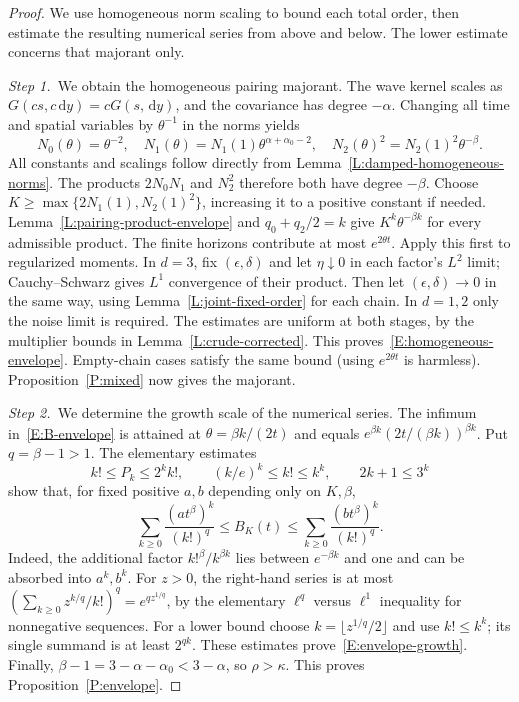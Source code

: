 \documentclass[12pt,oneside,openany]{book}
\numberwithin{equation}{section}
\theoremstyle{nogostyle}
\theoremstyle{definition}
\newcommand{\ud}{\,\mathrm{d}}
\begin{document}
\begin{proof}
  We use homogeneous norm scaling to bound each total order, then estimate the
  resulting numerical series from above and below. The lower estimate concerns
  that majorant only.


  \medskip
  \noindent\textit{Step 1.~}We obtain the homogeneous pairing majorant.
  The wave kernel scales as $G(cs,c\ud y) = cG(s,\ud y)$, and the covariance has
  degree $-\alpha$. Changing all time and spatial variables by $\theta^{-1}$ in
  the norms yields
  \begin{equation}\label{E:homogeneous-norms}
    N_0(\theta)=\theta^{-2},\quad
    N_1(\theta)=N_1(1)\theta^{\alpha+\alpha_0-2},\quad
    N_2(\theta)^2=N_2(1)^2\theta^{-\beta}.
  \end{equation}
  All constants and scalings follow directly from
  Lemma~\ref{L:damped-homogeneous-norms}. The products $2N_0N_1$ and $N_2^2$
  therefore both have degree $-\beta$. Choose $K \ge \max\{2N_1(1),N_2(1)^2\}$,
  increasing it to a positive constant if needed.
  Lemma~\ref{L:pairing-product-envelope} and $q_0+q_2/2 = k$ give
  $K^k\theta^{-\beta k}$ for every admissible product. The finite horizons
  contribute at most $e^{2\theta t}$. Apply this first to regularized moments.
  In $d = 3$, fix $(\epsilon,\delta)$ and let $\eta\downarrow0$ in each factor's
  $L^2$ limit; Cauchy--Schwarz gives $L^1$ convergence of their product. Then
  let $(\epsilon,\delta) \to 0$ in the same way, using
  Lemma~\ref{L:joint-fixed-order} for each chain. In $d = 1,2$ only the noise
  limit is required. The estimates are uniform at both stages, by the multiplier
  bounds in Lemma~\ref{L:crude-corrected}. This
  proves~\eqref{E:homogeneous-envelope}. Empty-chain cases satisfy the same
  bound (using $e^{2\theta t}$ is harmless). Proposition~\ref{P:mixed} now gives
  the majorant.


  \medskip
  \noindent\textit{Step 2.~}We determine the growth scale of the numerical
  series.
  The infimum in~\eqref{E:B-envelope} is attained at $\theta = \beta k/(2t)$ and
  equals $e^{\beta k}(2t/(\beta k))^{\beta k}$. Put $q = \beta-1 > 1$. The
  elementary estimates
  \[
    k!\le P_k\le2^k k!,\qquad
    (k/e)^k\le k!\le k^k,\qquad 2k+1\le3^k
  \]
  show that, for fixed positive $a,b$ depending only on $K,\beta$,
  \[
    \sum_{k\ge0}\frac{(at^\beta)^k}{(k!)^q}
    \le B_K(t)\le
    \sum_{k\ge0}\frac{(bt^\beta)^k}{(k!)^q}.
  \]
  Indeed, the additional factor $k!^\beta/k^{\beta k}$ lies between $e^{-\beta
  k}$ and one and can be absorbed into $a^k,b^k$. For $z > 0$, the right-hand
  series is at most $(\sum_{k\ge0}z^{k/q}/k!)^q = e^{qz^{1/q}}$, by the
  elementary $\ell^q$ versus $\ell^1$ inequality for nonnegative sequences. For
  a lower bound choose $k = \lfloor z^{1/q}/2\rfloor$ and use $k! \le k^k$; its
  single summand is at least $2^{qk}$. These estimates
  prove~\eqref{E:envelope-growth}. Finally, $\beta-1 = 3-\alpha-\alpha_0 <
  3-\alpha$, so $\rho > \kappa$. This proves Proposition~\ref{P:envelope}.
\end{proof}
\end{document}
